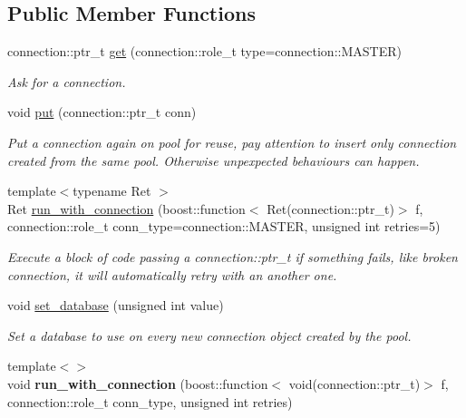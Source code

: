 \subsection*{Public Member Functions}
\begin{DoxyCompactItemize}
\item 
connection\-::ptr\-\_\-t \hyperlink{classredis3m_1_1connection__pool_a64b7414a59f5ebb741f60f15269239cb}{get} (connection\-::role\-\_\-t type=connection\-::\-M\-A\-S\-T\-E\-R)
\begin{DoxyCompactList}\small\item\em Ask for a connection. \end{DoxyCompactList}\item 
void \hyperlink{classredis3m_1_1connection__pool_af98d6557618b0b3f2fb98a16f1248884}{put} (connection\-::ptr\-\_\-t conn)
\begin{DoxyCompactList}\small\item\em Put a connection again on pool for reuse, pay attention to insert only connection created from the same pool. Otherwise unpexpected behaviours can happen. \end{DoxyCompactList}\item 
{\footnotesize template$<$typename Ret $>$ }\\Ret \hyperlink{classredis3m_1_1connection__pool_a4bbb7ca50a001ae9f3917def5007d0d7}{run\-\_\-with\-\_\-connection} (boost\-::function$<$ Ret(connection\-::ptr\-\_\-t)$>$ f, connection\-::role\-\_\-t conn\-\_\-type=connection\-::\-M\-A\-S\-T\-E\-R, unsigned int retries=5)
\begin{DoxyCompactList}\small\item\em Execute a block of code passing a connection\-::ptr\-\_\-t if something fails, like broken connection, it will automatically retry with an another one. \end{DoxyCompactList}\item 
void \hyperlink{classredis3m_1_1connection__pool_a6d42ddca75faeb5c33f9d3bf04f44c5b}{set\-\_\-database} (unsigned int value)
\begin{DoxyCompactList}\small\item\em Set a database to use on every new connection object created by the pool. \end{DoxyCompactList}\item 
\hypertarget{classredis3m_1_1connection__pool_ab57e4c5fd3b58fb7e2242825b7868478}{{\footnotesize template$<$$>$ }\\void {\bfseries run\-\_\-with\-\_\-connection} (boost\-::function$<$ void(connection\-::ptr\-\_\-t)$>$ f, connection\-::role\-\_\-t conn\-\_\-type, unsigned int retries)}\label{classredis3m_1_1connection__pool_ab57e4c5fd3b58fb7e2242825b7868478}

\end{DoxyCompactItemize}
